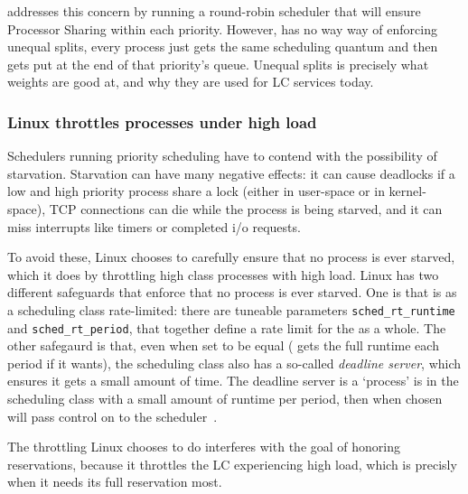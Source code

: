 \schedrr{} addresses this concern by running a round-robin scheduler that will
ensure Processor Sharing within each priority. However, \schedrr{} has no way
way of enforcing unequal splits, every process just gets the same scheduling
quantum and then gets put at the end of that priority's queue. Unequal splits is
precisely what weights are good at, and why they are used for LC services
today.

\subsubsection{Linux throttles \rtclass{} processes under high load
}\label{sss:approach:linux:starve-throttle}

Schedulers running priority scheduling have to contend with the possibility of
starvation. Starvation can have many negative effects: it can cause deadlocks if
a low and high priority process share a lock (either in user-space or in
kernel-space), TCP connections can die while the process is being starved, and
it can miss interrupts like timers or completed i/o requests.

To avoid these, Linux chooses to carefully ensure that no process is ever
starved, which it does by throttling high class processes with high load. Linux
has two different safeguards that enforce that no process is ever starved. One
is that \rtclass{} is as a scheduling class rate-limited: there are tuneable
parameters \texttt{sched\_rt\_runtime} and \texttt{sched\_rt\_period}, that
together define a rate limit for the \rtclass{} as a whole. The other safegaurd
is that, even when set to be equal (\ie{} \rtclass{} gets the full runtime each
period if it wants), the \normalclass{} scheduling class also has a so-called
\textit{deadline server}, which ensures it gets a small amount of time. The
deadline server is a `process' is in the \deadlineclass{} scheduling class with
a small amount of runtime per period, then when chosen will pass control on to
the \normalclass{} scheduler~\cite{lkml-deadline-srv}.

The throttling Linux chooses to do interferes with the goal of honoring
reservations, because it throttles the LC experiencing high load, which is
precisly when it needs its full reservation  most.


